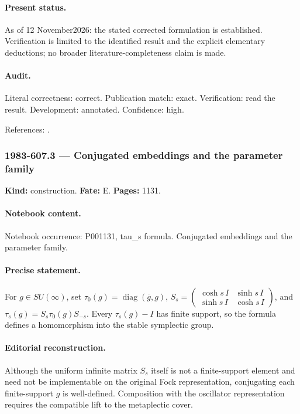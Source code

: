 \paragraph{Present status.} As of 12 November2026: the stated corrected formulation is established. Verification is limited to the identified result and the explicit elementary deductions; no broader literature-completeness claim is made.

\paragraph{Audit.} Literal correctness: correct. Publication match: exact. Verification: read the result. Development: annotated. Confidence: high.

\noindent References: \citep{olshanskii1983pairs}.\par

\subsubsection{1983-607.3 --- Conjugated embeddings and the parameter family}

\label{item:1983-607.3}

\noindent\textbf{Kind:} construction. \textbf{Fate:} E. \textbf{Pages:} 1131.\par

\paragraph{Notebook content.} Notebook occurrence: P001131, tau_s formula. Conjugated embeddings and the parameter family.

\paragraph{Precise statement.} For \(g\in SU(\infty)\), set \(\tau_0(g)=\operatorname{diag}(\overline g,g)\), \(S_s=\begin{pmatrix}\cosh s\,I&\sinh s\,I\\ \sinh s\,I&\cosh s\,I\end{pmatrix}\), and \(\tau_s(g)=S_s\tau_0(g)S_{-s}\). Every \(\tau_s(g)-I\) has finite support, so the formula defines a homomorphism into the stable symplectic group.

\paragraph{Editorial reconstruction.} Although the uniform infinite matrix \(S_s\) itself is not a finite-support element and need not be implementable on the original Fock representation, conjugating each finite-support \(g\) is well-defined. Composition with the oscillator representation requires the compatible lift to the metaplectic cover.

